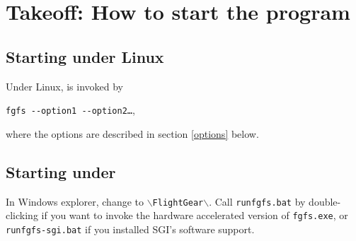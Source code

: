 

\chapter{Takeoff: How to start the program\label{takeoff}}

\section{Starting under Linux}
Under Linux, \FlightGear is invoked by

  \texttt{fgfs -$\!$-option1 -$\!$-option2\dots},

\noindent
 where the options are described in section \ref{options} below.

\section{Starting under }

In Windows explorer, change to \texttt{$\backslash$FlightGear$\backslash$}. Call
\texttt{runfgfs.bat} by double-clicking if you want to invoke the hardware accelerated
version of \FlightGear \texttt{fgfs.exe}, or \texttt{runfgfs-sgi.bat} if you installed
SGI's software  support.

